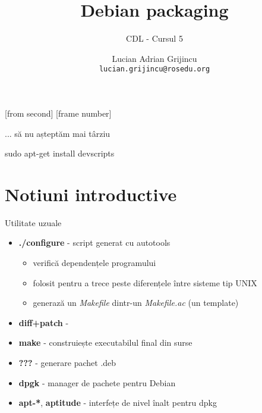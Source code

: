 \documentclass{beamer}
\title[Debian packaging]{Debian packaging}
\subtitle{CDL - Cursul 5}
\institute{ROSEdu}
\author{Lucian Adrian Grijincu \\ \texttt{lucian.grijincu@rosedu.org}}
\begin{document}
[from second]
[frame number]

\frame{\titlepage}

\frame{\tableofcontents}

\begin{frame}{... să nu așteptăm mai târziu}
  \begin{beamerboxesrounded}[lower=block body,shadow=true,width=9cm]{}
    \huge{sudo apt-get install devscripts}
  \end{beamerboxesrounded}
\end{frame}


\section{Notiuni introductive}

\frame{\tableofcontents[currentsection]}


\begin{frame}{Utilitate uzuale}
  \begin{itemize}[<+->]
  \item \textbf{./configure} - script generat cu autotools
    \begin{itemize}
    \item verifică dependențele programului
    \item folosit pentru a trece peste diferențele între sisteme tip UNIX
    \item generază un \textit{Makefile} dintr-un \textit{Makefile.ac} (un template)
    \end{itemize}
  \item \textbf{diff+patch} - 
  \item \textbf{make} - construiește executabilul final din surse
  \item \textbf{???} - generare pachet .deb
  \item \textbf{dpgk} - manager de pachete pentru Debian
  \item \textbf{apt-*}, \textbf{aptitude} - interfețe de nivel înalt pentru dpkg
  \end{itemize}
\end{frame}
\end{document}
